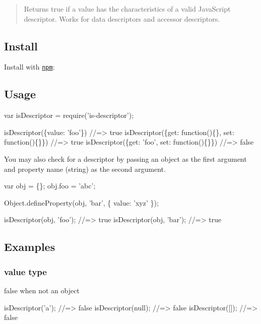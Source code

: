 \begin{quote}
Returns true if a value has the characteristics of a valid Java\+Script descriptor. Works for data descriptors and accessor descriptors. \end{quote}


\subsection*{Install}

Install with \href{https://www.npmjs.com/}{\tt npm}\+:




\subsection*{Usage}


\begin{DoxyCode}
var isDescriptor = require('is-descriptor');

isDescriptor(\{value: 'foo'\})
//=> true
isDescriptor(\{get: function()\{\}, set: function()\{\}\})
//=> true
isDescriptor(\{get: 'foo', set: function()\{\}\})
//=> false
\end{DoxyCode}


You may also check for a descriptor by passing an object as the first argument and property name ({\ttfamily string}) as the second argument.


\begin{DoxyCode}
var obj = \{\};
obj.foo = 'abc';

Object.defineProperty(obj, 'bar', \{
  value: 'xyz'
\});

isDescriptor(obj, 'foo');
//=> true
isDescriptor(obj, 'bar');
//=> true
\end{DoxyCode}


\subsection*{Examples}

\subsubsection*{value type}

{\ttfamily false} when not an object


\begin{DoxyCode}
isDescriptor('a');
//=> false
isDescriptor(null);
//=> false
isDescriptor([]);
//=> false
\end{DoxyCode}


